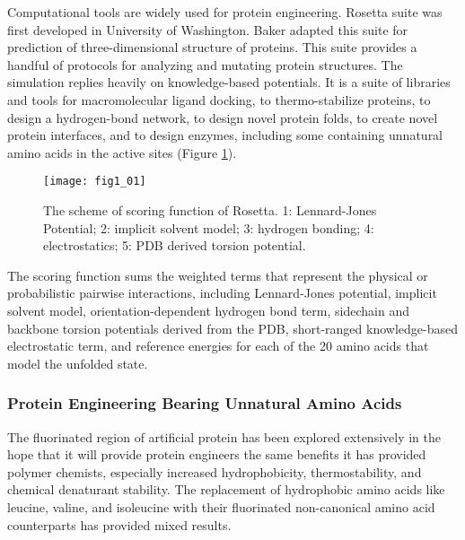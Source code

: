 \begin{refsection}
Computational tools are widely used for protein
engineering\cite{Rothlisberger2008,DiMaio2011a,Korkegian2005,
Leaver-Fay2013a,Leaver-Fay2011,Drew2013a,Kaufmann2010,Rohl2004}.
Rosetta suite was first developed in University of Washington. Baker  adapted this suite for prediction of three-dimensional structure of
proteins\cite{Leaver-Fay2011}. This suite provides a handful of protocols for
analyzing and mutating protein structures.  The simulation replies heavily on
knowledge-based potentials. It is a suite of libraries and tools for
macromolecular ligand docking, to thermo-stabilize proteins, to design a
hydrogen-bond network, to design novel protein folds, to create novel protein
interfaces, and to design enzymes, including some containing unnatural amino
acids in the active sites (Figure \ref{fig:rosetta-intro}).
\begin{figure}[h!] \centering \texttt{[image: fig1\_01]}
    \caption[The scheme of scoring function of Rosetta. 1: Lennard-Jones
    Potential; 2: implicit solvent model; 3: hydrogen bonding; 4:
electrostatics; 5: PDB drived torsion potential.]{The scheme of scoring
    function of Rosetta. 1: Lennard-Jones Potential; 2: implicit solvent model;
3: hydrogen bonding; 4: electrostatics; 5: PDB derived torsion potential.}
\label{fig:rosetta-intro}
\end{figure}
The scoring function sums the weighted terms that represent the physical or
probabilistic pairwise interactions\cite{Rohl2004}, including Lennard-Jones
potential, implicit solvent model\cite{Lazaridis1999}, orientation-dependent
hydrogen bond term\cite{Kortemme2003}, sidechain and backbone torsion
potentials derived from the PDB, short-ranged knowledge-based electrostatic
term, and reference energies for each of the 20 amino acids that model the
unfolded state.

\subsubsection{Protein Engineering Bearing Unnatural Amino Acids}

The fluorinated region of artificial protein has been explored
extensively in the hope that it will provide protein engineers the same
benefits it has provided polymer chemists, especially increased hydrophobicity,
thermostability, and chemical denaturant stability. The replacement of
hydrophobic amino acids like leucine, valine, and isoleucine with their
fluorinated non-canonical amino acid counterparts has provided mixed results.


\end{refsection}
